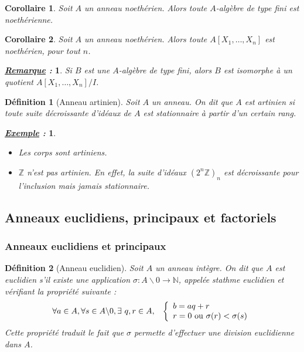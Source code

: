 \documentclass{article}           %
\newcommand\N{\mathbb{N}}
\newcommand\Z{\mathbb{Z}}
\let\dummy\exists						%
\renewcommand*{\exists}{\dummy \,}
\newcommand\tq{\hspace{0.3cm}} 		%
\newcommand\noset[1]{\backslash{#1}} 	%
\theoremstyle{break}
\theoremstyle{add}
\theoremstyle{break} %
\newtheorem{corollaire}{Corollaire}[section]
\newtheorem{definition}{Définition}[section]
\theoremstyle{add}
\newtheorem*{exemple}{\textit{\underline{Exemple} :}}
\newtheorem*{remarque}{\textit{\underline{Remarque} : }}
\newcommand\NL{
\mbox{}
\vspace*{-\parsep}
\vspace*{-\baselineskip}}
\begin{document}
\begin{corollaire}
Soit $A$ un anneau noethérien. Alors toute $A$-algèbre de type fini est noethérienne.
\end{corollaire}

\begin{corollaire}
Soit $A$ un anneau noethérien. Alors toute $A[X_1, \ldots, X_n]$ est noethérien, pour tout $n$.
\end{corollaire}

\begin{remarque}
Si $B$ est une $A$-algèbre de type fini, alors $B$ est isomorphe à un quotient $A[X_1, \ldots, X_n]/I$.
\end{remarque}


\begin{definition}[Anneau artinien]
Soit $A$ un anneau. On dit que $A$ est \textit{artinien} si toute suite décroissante d'idéaux de $A$ est stationnaire à partir d'un certain rang.
\end{definition}

\begin{exemple}\NL
\begin{itemize}
\item Les corps sont artiniens.
\item $\Z$ n'est pas artinien. En effet, la suite d'idéaux $(2^{n}\Z)_n$ est décroissante pour l'inclusion mais jamais stationnaire.
\end{itemize}
\end{exemple}




\subsection{Anneaux euclidiens, principaux et factoriels}

\subsubsection{Anneaux euclidiens et principaux}

\begin{definition}[Anneau euclidien]
Soit $A$ un anneau intègre. On dit que $A$ est \textit{euclidien} s'il existe une application $\sigma : A\noset{0} \longrightarrow \N$, appelée \textit{stathme euclidien} et vérifiant la propriété suivante :
$$ \forall a \in A, \forall s \in A \noset{0}, \exists q,r \in A, \tq   \left \{ \begin{array}{l} b = aq + r \\ r = 0 \textrm{ ou } \sigma(r) < \sigma(s) \end{array} \right . $$
Cette propriété traduit le fait que $\sigma$ permette d'effectuer une division euclidienne dans $A$.
\end{definition}
\end{document}
